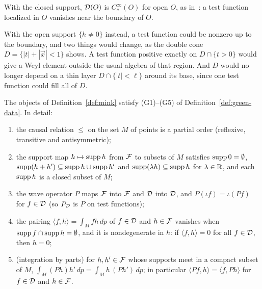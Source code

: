 \begin{remark}\label{rem:mink-supports}
With the closed support, $\mathcal D(O)$ is $C_c^\infty(O)$ for open $O$, as in~\cite{dimock}: a test
function localized in $O$ vanishes near the boundary of $O$.

With the open support $\{h\neq0\}$ instead, a test function could be nonzero up to the boundary, and
two things would change, as the double cone $D=\{|t|+|\vec x|<1\}$ shows. A test function positive
exactly on $D\cap\{t>0\}$ would give a Weyl element outside the usual algebra of that region. And
$D$ would no longer depend on a thin layer $D\cap\{|t|<\ell\}$ around its base, since one test
function could fill all of $D$.
\end{remark}

\begin{proposition}\label{prop:mink-basic}
The objects of Definition~\ref{def:mink} satisfy (G1)--(G5) of Definition~\ref{def:green-data}. In
detail:
\begin{enumerate}[label=(\alph*),leftmargin=2.5em]
\item the causal relation $\leq$ on the set $M$ of points is a partial order (reflexive, transitive
and antisymmetric);
\item the support map $h\mapsto\operatorname{supp} h$ from $\mathcal F$ to subsets of $M$ satisfies $\operatorname{supp}0=\emptyset$,
$\operatorname{supp}(h+h')\subseteq\operatorname{supp} h\cup\operatorname{supp} h'$ and $\operatorname{supp}(\lambda h)\subseteq\operatorname{supp} h$ for $\lambda\in\mathbb R$, and
each $\operatorname{supp} h$ is a closed subset of $M$;
\item the wave operator $P$ maps $\mathcal F$ into $\mathcal F$ and $\mathcal D$ into $\mathcal D$, and $P(\iota f)=\iota(Pf)$ for
$f\in\mathcal D$ (so $P_\mathcal D$ is $P$ on test functions);
\item the pairing $\langle f,h\rangle=\int_Mfh\,dp$ of $f\in\mathcal D$ and $h\in\mathcal F$ vanishes when
$\operatorname{supp} f\cap\operatorname{supp} h=\emptyset$, and it is nondegenerate in $h$: if $\langle f,h\rangle=0$ for all
$f\in\mathcal D$, then $h=0$;
\item (integration by parts) for $h,h'\in\mathcal F$ whose supports meet in a compact subset of $M$,
$\int_M(Ph)h'\,dp=\int_Mh\,(Ph')\,dp$; in particular $\langle Pf,h\rangle=\langle f,Ph\rangle$ for
$f\in\mathcal D$ and $h\in\mathcal F$.
\end{enumerate}
\end{proposition}
